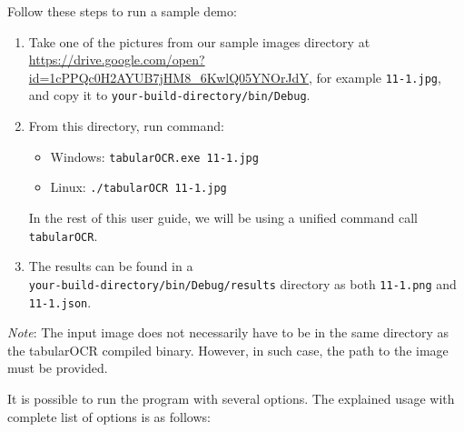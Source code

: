 Follow these steps to run a sample demo:
\begin{enumerate}
    \item Take one of the pictures from our sample images directory at \url{https://drive.google.com/open?id=1cPPQc0H2AYUB7jHM8_6KwlQ05YNOrJdY}, for example \texttt{11-1.jpg}, and copy it to \texttt{your-build-directory/bin/Debug}.
    \item From this directory, run command:
        \begin{itemize}
            \item Windows: \texttt{tabularOCR.exe 11-1.jpg}
            \item Linux: \texttt{./tabularOCR 11-1.jpg}
        \end{itemize}
        In the rest of this user guide, we will be using a unified command call \texttt{tabularOCR}.
    \item The results can be found in a \\
    \texttt{your-build-directory/bin/Debug/results} directory as both \texttt{11-1.png} and \texttt{11-1.json}.
\end{enumerate}

\emph{Note}: The input image does not necessarily have to be in the same directory as the tabularOCR compiled binary. However, in such case, the path to the image must be provided.

It is possible to run the program with several options. The explained usage with complete list of options is as follows:

